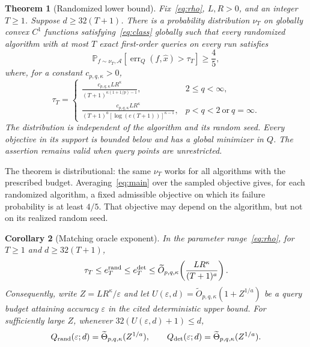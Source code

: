 \documentclass[11pt,a4paper]{article}
\newtheorem{theorem}{Theorem}[section]
\newtheorem{corollary}[theorem]{Corollary}
\theoremstyle{definition}
\theoremstyle{remark}
\newcommand{\Prb}{\mathbb P}
\newcommand{\eps}{\varepsilon}
\newcommand{\tO}{\widetilde O}
\newcommand{\tTheta}{\widetilde\Theta}
\DeclareMathOperator{\err}{err}
\begin{document}
\begin{theorem}[Randomized lower bound]\label{thm:main}
Fix~\eqref{eq:rho}, $L,R>0$, and an integer $T\ge1$.
Suppose $d\ge32(T+1)$. There is a probability distribution $\nu_T$ on
globally convex $C^1$ functions satisfying~\eqref{eq:class} globally such that
every randomized algorithm with at most $T$ exact first-order queries on
every run satisfies
\begin{equation}\label{eq:main}
  \Prb_{f\sim\nu_T,\mathcal A}
       [\err_Q(f,\widehat x)>\tau_T]\ge\frac45,
\end{equation}
where, for a constant $c_{p,q,\kappa}>0$,
\begin{equation}\label{eq:threshold}
\tau_T=
\begin{cases}
\displaystyle
 \frac{c_{p,q,\kappa}LR^\kappa}
      {(T+1)^{\kappa(1+1/p)-1}},
 & 2\le q<\infty,\\[10pt]
\displaystyle
 \frac{c_{p,q,\kappa}LR^\kappa}
      {(T+1)^a[\log(e(T+1))]^{\kappa-1}},
 & p<q<2\ \text{or}\ q=\infty.
\end{cases}
\end{equation}
The distribution is independent of the algorithm and its random seed.
Every objective in its support is bounded below and has a global minimizer
in $Q$. The assertion remains valid when query points are unrestricted.
\end{theorem}

The theorem is distributional: the same $\nu_T$ works for all algorithms
with the prescribed budget. Averaging~\eqref{eq:main} over the sampled
objective gives, for each randomized algorithm, a fixed admissible objective
on which its failure probability is at least $4/5$. That objective may depend
on the algorithm, but not on its realized random seed.

\begin{corollary}[Matching oracle exponent]\label{cor:matching}
In the parameter range~\eqref{eq:rho}, for $T\ge1$ and
$d\ge32(T+1)$,
\begin{equation}\label{eq:error-sandwich}
  \tau_T\le e_T^{\rm rand}\le e_T^{\rm det}
  \le\tO_{p,q,\kappa}\!\left(\frac{LR^\kappa}{(T+1)^a}\right).
\end{equation}
Consequently, write $Z=LR^\kappa/\eps$ and let
$U(\eps,d)=\tO_{p,q,\kappa}(1+Z^{1/a})$ be a query budget attaining accuracy
$\eps$ in the cited deterministic upper bound.
For sufficiently large $Z$, whenever $32(U(\eps,d)+1)\le d$,
\begin{equation}\label{eq:query}
  Q_{\rm rand}(\eps;d)=\tTheta_{p,q,\kappa}(Z^{1/a}),
  \qquad
  Q_{\rm det}(\eps;d)=\tTheta_{p,q,\kappa}(Z^{1/a}).
\end{equation}
\end{corollary}
\end{document}
